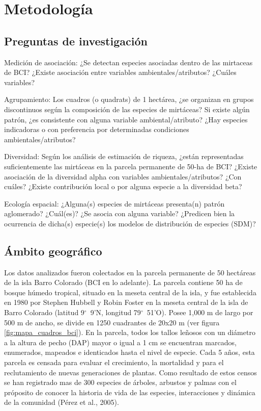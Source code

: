 \documentclass[11pt,]{article}
\begin{document}
\section{Metodología}\label{metodologuxeda}

\subsection{Preguntas de
investigación}\label{preguntas-de-investigaciuxf3n}

Medición de asociación: ¿Se detectan especies asociadas dentro de las
mirtaceas de BCI? ¿Existe asociación entre variables
ambientales/atributos? ¿Cuáles variables?

Agrupamiento: Los cuadros (o quadrats) de 1 hectárea, ¿se organizan en
grupos discontinuos según la composición de las especies de mirtáceas?
Si existe algún patrón, ¿es consistente con alguna variable
ambiental/atributo? ¿Hay especies indicadoras o con preferencia por
determinadas condiciones ambientales/atributos?

Diversidad: Según los análisis de estimación de riqueza, ¿están
representadas suficientemente las mirtáceas en la parcela permanente de
50-ha de BCI? ¿Existe asociación de la diversidad alpha con variables
ambientales/atributos? ¿Con cuáles? ¿Existe contribución local o por
alguna especie a la diversidad beta?

Ecología espacial: ¿Alguna(s) especies de mirtáceas presenta(n) patrón
aglomerado? ¿Cuál(es)? ¿Se asocia con alguna variable? ¿Predicen bien la
ocurrencia de dicha(s) especie(s) los modelos de distribución de
especies (SDM)?

\subsection{Ámbito geográfico}\label{uxe1mbito-geogruxe1fico}

Los datos analizados fueron colectados en la parcela permanente de 50
hectáreas de la isla Barro Colorado (BCI en lo adelante). La parcela
contiene 50 ha de bosque húmedo tropical, situado en la meseta central
de la isla, y fue establecida en 1980 por Stephen Hubbell y Robin Foster
en la meseta central de la isla de Barro Colorado (latitud
9\(^\circ\)~9'N, longitud 79\(^\circ\)~51'O). Posee 1,000 m de largo por
500 m de ancho, se divide en 1250 cuadrantes de 20x20 m (ver figura
\ref{fig:mapa_cuadros_bci}). En la parcela, todos los tallos leñosos con
un diámetro a la altura de pecho (DAP) mayor o igual a 1 cm se
encuentran marcados, enumerados, mapeados e identicados hasta el nivel
de especie. Cada 5 años, esta parcela es censada para evaluar el
crecimiento, la mortalidad y para el reclutamiento de nuevas
generaciones de plantas. Como resultado de estos censos se han
registrado mas de 300 especies de árboles, arbustos y palmas con el
próposito de conocer la historia de vida de las especies, interacciones
y dinámica de la comunidad (Pérez et al., 2005).
\end{document}
